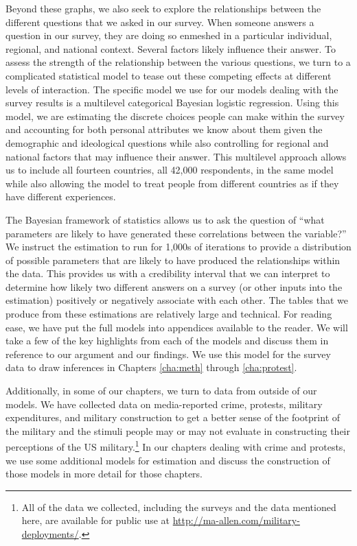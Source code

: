 Beyond these graphs, we also seek to explore the relationships between the different questions that we asked in our survey. When someone answers a question in our survey, they are doing so enmeshed in a particular individual, regional, and national context. Several factors likely influence their answer. To assess the strength of the relationship between the various questions, we turn to a complicated statistical model to tease out these competing effects at different levels of interaction. The specific model we use for our models dealing with the survey results is a multilevel categorical Bayesian logistic regression. Using this model, we are estimating the discrete choices people can make within the survey and accounting for both personal attributes we know about them given the demographic and ideological questions while also controlling for regional and national factors that may influence their answer. This multilevel approach allows us to include all fourteen countries, all 42,000 respondents, in the same model while also allowing the model to treat people from different countries as if they have different experiences.

The Bayesian framework of statistics allows us to ask the question of ``what parameters are likely to have generated these correlations between the variable?'' We instruct the estimation to run for 1,000s of iterations to provide a distribution of possible parameters that are likely to have produced the relationships within the data. This provides us with a credibility interval that we can interpret to determine how likely two different answers on a survey (or other inputs into the estimation) positively or negatively associate with each other. The tables that we produce from these estimations are relatively large and technical. For reading ease, we have put the full models into appendices available to the reader. We will take a few of the key highlights from each of the models and discuss them in reference to our argument and our findings. We use this model for the survey data to draw inferences in Chapters \ref{cha:meth} through \ref{cha:protest}.

Additionally, in some of our chapters, we turn to data from outside of our models. We have collected data on media-reported crime, protests, military expenditures, and military construction to get a better sense of the footprint of the military and the stimuli people may or may not evaluate in constructing their perceptions of the US military.\footnote{All of the data we collected, including the surveys and the data mentioned here, are available for public use at \url{http://ma-allen.com/military-deployments/}.} In our chapters dealing with crime and protests, we use some additional models for estimation and discuss the construction of those models in more detail for those chapters.
